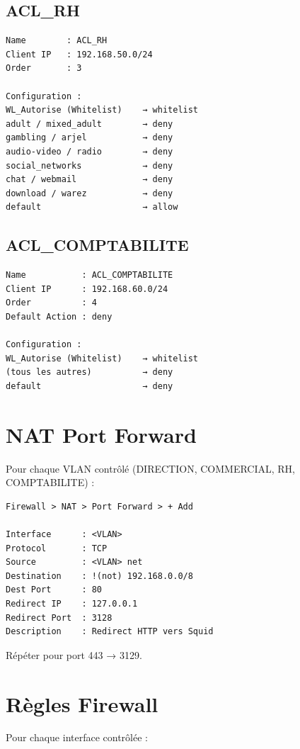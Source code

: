 \subsection{ACL\_RH}

\begin{lstlisting}
Name        : ACL_RH
Client IP   : 192.168.50.0/24
Order       : 3

Configuration :
WL_Autorise (Whitelist)    → whitelist
adult / mixed_adult        → deny
gambling / arjel           → deny
audio-video / radio        → deny
social_networks            → deny
chat / webmail             → deny
download / warez           → deny
default                    → allow
\end{lstlisting}

\subsection{ACL\_COMPTABILITE}

\begin{lstlisting}
Name           : ACL_COMPTABILITE
Client IP      : 192.168.60.0/24
Order          : 4
Default Action : deny

Configuration :
WL_Autorise (Whitelist)    → whitelist
(tous les autres)          → deny
default                    → deny
\end{lstlisting}

\section{NAT Port Forward}

Pour chaque VLAN contrôlé (DIRECTION, COMMERCIAL, RH, COMPTABILITE) :

\begin{lstlisting}
Firewall > NAT > Port Forward > + Add

Interface      : <VLAN>
Protocol       : TCP
Source         : <VLAN> net
Destination    : !(not) 192.168.0.0/8
Dest Port      : 80
Redirect IP    : 127.0.0.1
Redirect Port  : 3128
Description    : Redirect HTTP vers Squid
\end{lstlisting}

Répéter pour port 443 → 3129.

\section{Règles Firewall}

Pour chaque interface contrôlée :

